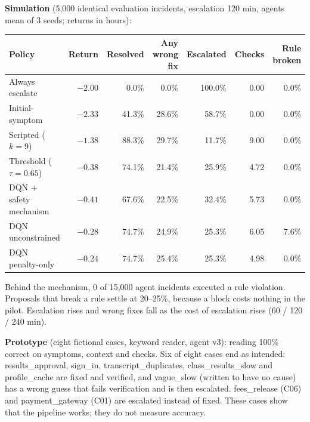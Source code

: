 \documentclass[11pt,a4paper]{article}
\begin{document}
\textbf{Simulation} (5,000 identical evaluation incidents, escalation 120 min, agents mean of 3
seeds; returns in hours):
\begin{center}\small
\begin{tabular}{@{}lrrrrrr@{}}
\toprule
Policy & Return & Resolved & Any wrong fix & Escalated & Checks & Rule broken \\
\midrule
Always escalate & $-2.00$ & 0.0\% & 0.0\% & 100.0\% & 0.00 & 0.0\% \\
Initial-symptom & $-2.33$ & 41.3\% & 28.6\% & 58.7\% & 0.00 & 0.0\% \\
Scripted ($k=9$) & $-1.38$ & 88.3\% & 29.7\% & 11.7\% & 9.00 & 0.0\% \\
Threshold ($\tau=0.65$) & $-0.38$ & 74.1\% & 21.4\% & 25.9\% & 4.72 & 0.0\% \\
DQN + safety mechanism & $-0.41$ & 67.6\% & 22.5\% & 32.4\% & 5.73 & 0.0\% \\
DQN unconstrained & $-0.28$ & 74.7\% & 24.9\% & 25.3\% & 6.05 & 7.6\% \\
DQN penalty-only & $-0.24$ & 74.7\% & 25.4\% & 25.3\% & 4.98 & 0.0\% \\
\bottomrule
\end{tabular}
\end{center}
Behind the mechanism, 0 of 15,000 agent incidents executed a rule violation. Proposals that
break a rule settle at 20--25\%, because a block costs nothing in the pilot. Escalation rises and
wrong fixes fall as the cost of escalation rises (60 / 120 / 240 min).

\textbf{Prototype} (eight fictional cases, keyword reader, agent v3): reading 100\% correct on
symptoms, context and checks. Six of eight cases end as intended: results\_approval, sign\_in,
transcript\_duplicates, class\_results\_slow and profile\_cache are fixed and verified, and
vague\_slow (written to have no cause) has a wrong guess that fails verification and is then
escalated. fees\_release (C06) and payment\_gateway (C01) are escalated instead of fixed. These
cases show that the pipeline works; they do not measure accuracy.

\end{document}
